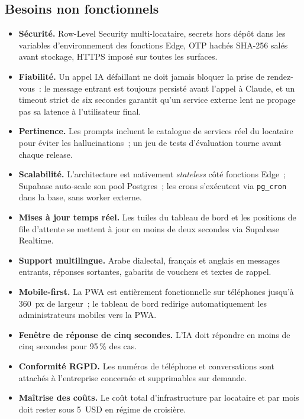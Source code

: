 \subsection{Besoins non fonctionnels}
\begin{itemize}
  \item \textbf{Sécurité.} Row-Level Security multi-locataire,
        secrets hors dépôt dans les variables d'environnement des
        fonctions Edge, OTP hachés SHA-256 salés avant stockage,
        HTTPS imposé sur toutes les surfaces.
  \item \textbf{Fiabilité.} Un appel IA défaillant ne doit jamais
        bloquer la prise de rendez-vous~: le message entrant est
        toujours persisté avant l'appel à Claude, et un timeout
        strict de six secondes garantit qu'un service externe lent
        ne propage pas sa latence à l'utilisateur final.
  \item \textbf{Pertinence.} Les prompts incluent le catalogue de
        services réel du locataire pour éviter les hallucinations~;
        un jeu de tests d'évaluation tourne avant chaque release.
  \item \textbf{Scalabilité.} L'architecture est nativement
        \emph{stateless} côté fonctions Edge~; Supabase auto-scale
        son pool Postgres~; les crons s'exécutent via
        \texttt{pg\_cron} dans la base, sans worker externe.
  \item \textbf{Mises à jour temps réel.} Les tuiles du tableau de
        bord et les positions de file d'attente se mettent à jour
        en moins de deux secondes via Supabase Realtime.
  \item \textbf{Support multilingue.} Arabe dialectal, français et
        anglais en messages entrants, réponses sortantes, gabarits
        de vouchers et textes de rappel.
  \item \textbf{Mobile-first.} La PWA est entièrement
        fonctionnelle sur téléphones jusqu'à 360~px de largeur~; le
        tableau de bord redirige automatiquement les administrateurs
        mobiles vers la PWA.
  \item \textbf{Fenêtre de réponse de cinq secondes.} L'IA doit
        répondre en moins de cinq secondes pour 95\,\% des cas.
  \item \textbf{Conformité RGPD.} Les numéros de téléphone et
        conversations sont attachés à l'entreprise concernée et
        supprimables sur demande.
  \item \textbf{Maîtrise des coûts.} Le coût total d'infrastructure
        par locataire et par mois doit rester sous 5~USD en régime
        de croisière.
\end{itemize}

